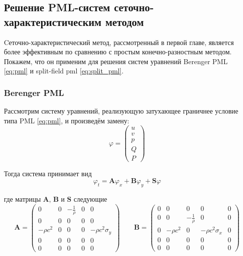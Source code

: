\subsection{Решение PML-систем сеточно-характеристическим методом}
    
Cеточно-характеристический метод, рассмотренный в первой главе, является более эффективным по сравнению с простым конечно-разностным методом. Покажем, что он применим для решения систем уравнений Berenger PML \eqref{eq:pml} и split-field pml \eqref{eq:split_pml}.
    
\subsubsection{Berenger PML}
    
Рассмотрим систему уравнений, реализующую затухающее граничнее условие типа PML \eqref{eq:pml}, и произведём замену:
\begin{equation}
    \varphi = \begin{pmatrix}
        u \\ v \\ p \\ Q \\ P
    \end{pmatrix}
\end{equation}
    
Тогда система принимает вид
\begin{equation}
    \varphi_t = \pmb{A}\varphi_x + \pmb{B}\varphi_y + \pmb{S}\varphi
\end{equation}

где матрицы $\pmb{A}$, $\pmb{B}$ и $\pmb{S}$ следующие
\begin{equation*}
    \pmb{A} = \begin{pmatrix}
        0 & 0 & -\frac{1}{\rho} & 0 & 0 \\
        0 & 0 & 0 & 0 & 0 \\
        -\rho c^2 & 0 & 0 & 0 & -\rho c^2 \sigma_y \\
        0 & 0 & 0 & 0 & 0 \\
        0 & 0 & 0 & 0 & 0
    \end{pmatrix} \qquad
	\pmb{B} = \begin{pmatrix}
        0 & 0 & 0 & 0 & 0 \\
        0 & 0 & -\frac{1}{\rho} & 0 & 0 \\
        0 & -\rho c^2  & 0 & -\rho c^2 \sigma_x & 0 \\
        0 & 0 & 0 & 0 & 0 \\
        0 & 0 & 0 & 0 & 0
    \end{pmatrix}
\end{equation*}
    
